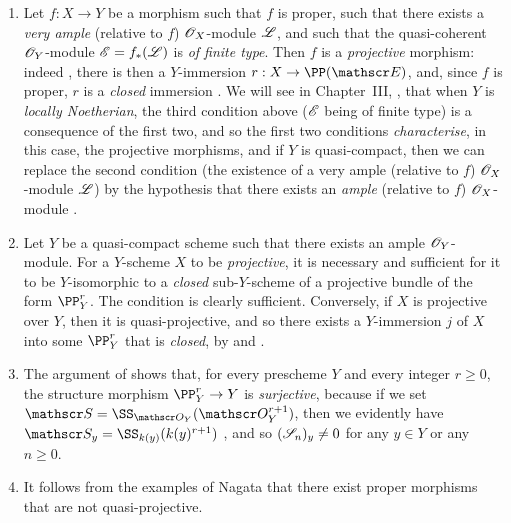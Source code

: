 \begin{rmk}[5.5.4]
\label{2.5.5.4}
\medskip\noindent
\begin{enumerate}[label=\emph{(\roman*)}]
    \item Let $f:X\to Y$ be a morphism such that $f$ is proper, such that there exists a \emph{very ample} (relative to $f$) $\mathscr{O}_X$-module $\mathscr{L}$, and such that the quasi-coherent $\mathscr{O}_Y$-module $\mathscr{E}=f_*(\mathscr{L})$ is \emph{of finite type}.
        Then $f$ is a \emph{projective} morphism:
        indeed , there is then a $Y$-immersion $r:X\to\PP(\sh{E})$, and, since $f$ is proper, $r$ is a \emph{closed} immersion .
        We will see in Chapter~III, , that when $Y$ is \emph{locally Noetherian}, the third condition above ($\mathscr{E}$ being of finite type) is a consequence of the first two, and so the first two conditions \emph{characterise}, in this case, the projective morphisms, and if $Y$ is quasi-compact, then we can replace the second condition (the existence of a very ample (relative to $f$) $\mathscr{O}_X$-module $\mathscr{L}$) by the hypothesis that there exists an \emph{ample} (relative to $f$) $\mathscr{O}_X$-module .
    \item Let $Y$ be a quasi-compact scheme such that there exists an ample $\mathscr{O}_Y$-module.
        For a $Y$-scheme $X$ to be \emph{projective}, it is necessary and sufficient for it to be $Y$-isomorphic to a \emph{closed} sub-$Y$-scheme of a projective bundle of the form $\PP_Y^r$.
        The condition is clearly sufficient.
        Conversely, if $X$ is projective over $Y$, then it is quasi-projective, and so there exists a $Y$-immersion $j$ of $X$ into some $\PP_Y^r$  that is \emph{closed}, by  and .
    \item The argument of  shows that, for every prescheme $Y$ and every integer $r\geq0$, the structure morphism $\PP_Y^r\to Y$ is \emph{surjective}, because if we set $\sh{S}=\SS_{\OO_Y}(\OO_Y^{r+1})$, then we evidently have $\sh{S}_y=\SS_{\kres(y)}(\kres(y)^{r+1})$ , and so $(\mathscr{S}_n)_y\neq0$ for any $y\in Y$ or any $n\geq0$.
    \item It follows from the examples of Nagata \cite{II-26} that there exist proper morphisms that are not quasi-projective.
\end{enumerate}
\end{rmk}

